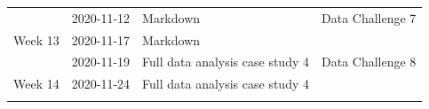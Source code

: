 \documentclass[
]{book}
\begin{document}
\begin{longtable}[]{@{}llll@{}}
\begin{minipage}[t]{0.22\columnwidth}
\strut
\end{minipage} & \begin{minipage}[t]{0.22\columnwidth}\raggedright
2020-11-12\strut
\end{minipage} & \begin{minipage}[t]{0.22\columnwidth}\raggedright
Markdown\strut
\end{minipage} & \begin{minipage}[t]{0.22\columnwidth}\raggedright
Data Challenge 7\strut
\end{minipage}\tabularnewline
\begin{minipage}[t]{0.22\columnwidth}\raggedright
Week 13\strut
\end{minipage} & \begin{minipage}[t]{0.22\columnwidth}\raggedright
2020-11-17\strut
\end{minipage} & \begin{minipage}[t]{0.22\columnwidth}\raggedright
Markdown\strut
\end{minipage} & \begin{minipage}[t]{0.22\columnwidth}\raggedright
\strut
\end{minipage}\tabularnewline
\begin{minipage}[t]{0.22\columnwidth}\raggedright
\strut
\end{minipage} & \begin{minipage}[t]{0.22\columnwidth}\raggedright
2020-11-19\strut
\end{minipage} & \begin{minipage}[t]{0.22\columnwidth}\raggedright
Full data analysis case study 4\strut
\end{minipage} & \begin{minipage}[t]{0.22\columnwidth}\raggedright
Data Challenge 8\strut
\end{minipage}\tabularnewline
\begin{minipage}[t]{0.22\columnwidth}\raggedright
Week 14\strut
\end{minipage} & \begin{minipage}[t]{0.22\columnwidth}\raggedright
2020-11-24\strut
\end{minipage} & \begin{minipage}[t]{0.22\columnwidth}\raggedright
Full data analysis case study 4\strut
\end{minipage} & \begin{minipage}[t]{0.22\columnwidth}\raggedright
\strut
\end{minipage}\tabularnewline
\begin{minipage}[t]{0.22\columnwidth}\raggedright

\end{minipage}
\end{longtable}
\end{document}
